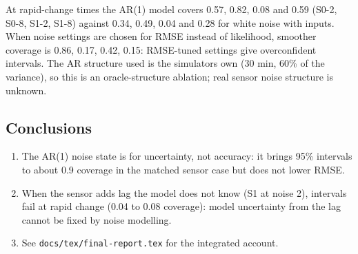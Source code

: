 \documentclass[11pt,a4paper]{article}
\providecommand{\tightlist}{\setlength{\itemsep}{0pt}\setlength{\parskip}{0pt}}
\begin{document}
At rapid-change times the AR(1) model covers 0.57, 0.82, 0.08 and 0.59
(S0-2, S0-8, S1-2, S1-8) against 0.34, 0.49, 0.04 and 0.28 for white
noise with inputs. When noise settings are chosen for RMSE instead of
likelihood, smoother coverage is 0.86, 0.17, 0.42, 0.15: RMSE-tuned
settings give overconfident intervals. The AR structure used is the
simulator\textquotesingle s own (30 min, 60\% of the variance), so this
is an oracle-structure ablation; real sensor noise structure is unknown.

\hypertarget{conclusions}{%
\subsection{Conclusions}\label{conclusions}}

\begin{enumerate}
\def\labelenumi{\arabic{enumi}.}
\tightlist
\item
  The AR(1) noise state is for uncertainty, not accuracy: it brings 95\%
  intervals to about 0.9 coverage in the matched sensor case but does
  not lower RMSE.
\item
  When the sensor adds lag the model does not know (S1 at noise 2),
  intervals fail at rapid change (0.04 to 0.08 coverage): model
  uncertainty from the lag cannot be fixed by noise modelling.
\item
  See \texttt{docs/tex/final-report.tex} for the integrated account.
\end{enumerate}
\end{document}
